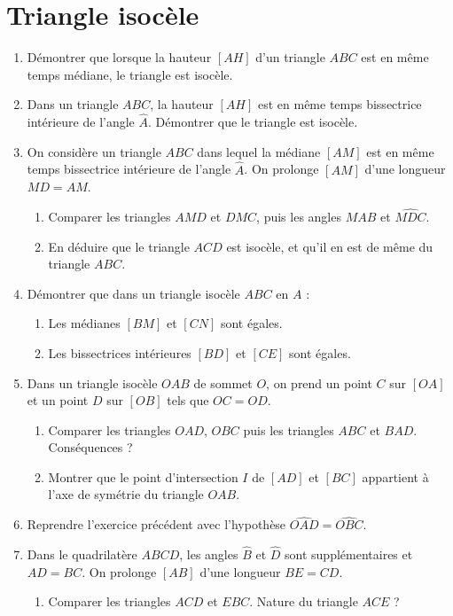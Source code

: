 
\chapter{Triangle isocèle}
\begin{enumerate}
\item Démontrer que lorsque la hauteur $[AH]$ d'un triangle $ABC$ est en même temps médiane, le triangle est isocèle.
\item Dans un triangle $ABC$, la hauteur $[AH]$ est en même temps bissectrice intérieure de l'angle $\widehat{A}$. Démontrer que le triangle est isocèle.
\item On considère un triangle $ABC$ dans lequel la médiane $[AM]$ est 
en même temps bissectrice intérieure de l'angle $\widehat{A}$. On prolonge $[AM]$ 
d'une longueur $MD=AM$. \begin{enumerate}
\item Comparer les triangles $AMD$ et $DMC$, puis les angles $\widehat{MAB}$ et 
$\widehat{MDC}$. 
\item En déduire que le triangle $ACD$ est isocèle, et qu'il en est de même du triangle $ABC$.
\end{enumerate}
\item Démontrer que dans un triangle isocèle $ABC$ en $A$ : \begin{enumerate}
\item Les médianes $[BM]$ et $[CN]$ sont égales. 
\item Les bissectrices intérieures $[BD]$ et $[CE]$ sont égales.
\end{enumerate}
\item Dans un triangle isocèle $OAB$ de sommet $O$, on prend un point $C$ sur $[OA]$
et un point $D$ sur $[OB]$ tels que $OC=OD$.\begin{enumerate}
\item Comparer les triangles $OAD$, $OBC$ puis les triangles $ABC$ et $BAD$. Conséquences ? 
\item Montrer que le point d'intersection $I$ de $[AD]$ et $[BC]$ appartient à l'axe
de symétrie du triangle $OAB$.
\end{enumerate}
\item Reprendre l'exercice précédent avec l'hypothèse $\widehat{OAD}=\widehat{OBC}$.
\item Dans le quadrilatère $ABCD$, les angles $\widehat{B}$ et $\widehat{D}$ sont supplémentaires et $AD=BC$. On prolonge $[AB]$ d'une longueur $BE=CD$.
\begin{enumerate}
\item Comparer les triangles $ACD$ et $EBC$. Nature du triangle $ACE$ ?

\end{enumerate}
\end{enumerate}
